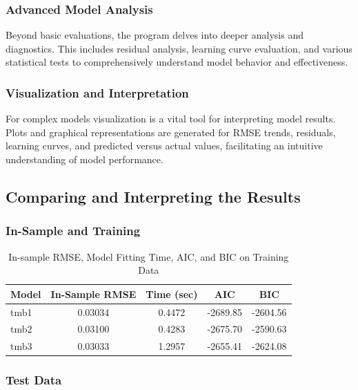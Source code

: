 \documentclass[12pt, twoside,hidelinks]{article}
\theoremstyle{definition}
\numberwithin{equation}{section}
\begin{document}
\subsubsection*{Advanced Model Analysis}
Beyond basic evaluations, the program delves into deeper analysis and diagnostics. This includes residual analysis, learning curve evaluation, and various statistical tests to comprehensively understand model behavior and effectiveness.


\subsubsection*{Visualization and Interpretation}
For complex models visualization is a vital tool for interpreting model results. Plots and graphical representations are generated for RMSE trends, residuals, learning curves, and predicted versus actual values, facilitating an intuitive understanding of model performance.

\subsection{Comparing and Interpreting the Results}


\subsubsection*{In-Sample and Training}


\begin{table}[h]
\centering
\begin{tabular}{|l|c|c|c|c|}
\hline
Model & In-Sample RMSE & Time (sec) & AIC & BIC \\
\hline
tmb1 & 0.03034 & 0.4472 & -2689.85 & -2604.56 \\
tmb2 & 0.03100 & 0.4283 & -2675.70 & -2590.63 \\
tmb3 & 0.03033 & 1.2957 & -2655.41 & -2624.08 \\
\hline
\end{tabular}
\caption{In-sample RMSE, Model Fitting Time, AIC, and BIC on Training Data}
\end{table}


\subsubsection*{Test Data}
\newpage
\end{document}
